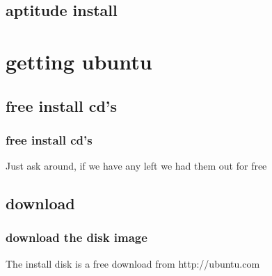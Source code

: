 \documentclass[hyperref={pdfpagelabels=false}]{beamer}
\begin{document}
\subsection{aptitude install}
\section{getting ubuntu}
\subsection{free install cd's}
\frame
{
    \frametitle{free install cd's}
    Just ask around, if we have any left we had them out for free
}
\subsection{download}
\frame
{
    \frametitle{download the disk image}
    The install disk is a free download from http://ubuntu.com
}
\end{document}
